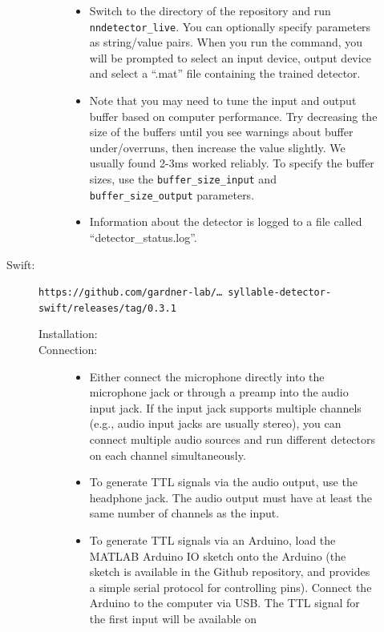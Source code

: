 \documentclass[10pt,letterpaper]{article}
\begin{document}
\begin{description}
\begin{description}
\begin{description}
\begin{itemize}
      \item Switch to the directory of the repository and run {\tt nndetector\_live}. You
      can optionally specify parameters as string/value pairs. When you run the command,
      you will be prompted to select an input device, output device and select a ``.mat''
      file containing the trained detector.
      \item Note that you may need to tune the input and output buffer based on computer 
      performance. Try decreasing the size of the buffers until you see warnings about buffer
      under/overruns, then increase the value slightly. We usually found 2-3ms worked reliably.
      To specify the buffer sizes, use the {\tt buffer\_size\_input} and 
      {\tt buffer\_size\_output} parameters.
      \item Information about the detector is logged to a file called ``detector\_status.log''.
      \end{itemize}
    \end{description}
  \item[Swift:] {\tt https://github.com/gardner-lab/\dots\ syllable-detector-swift/releases/tag/0.3.1}
    \begin{description}
    \item[Installation:]\hfill
    \item[Connection:]\hfill
      \begin{itemize}
      \item Either connect the microphone directly into the microphone jack or through a 
      preamp into the audio input jack. If the input jack supports multiple channels (e.g., 
      audio input jacks are usually stereo), you can connect multiple audio sources and run 
      different detectors on each channel simultaneously.
      \item To generate TTL signals via the audio output, use the headphone jack. The 
      audio output must have at least the same number of channels as the input.
      \item To generate TTL signals via an Arduino, load the MATLAB Arduino IO sketch 
      onto the Arduino (the sketch is available in the Github repository, and provides a 
      simple serial protocol for controlling pins). Connect the Arduino 
      to the computer via USB. The TTL signal for the first input will be available on 

\end{itemize}
\end{description}
\end{description}
\end{description}
\end{document}
